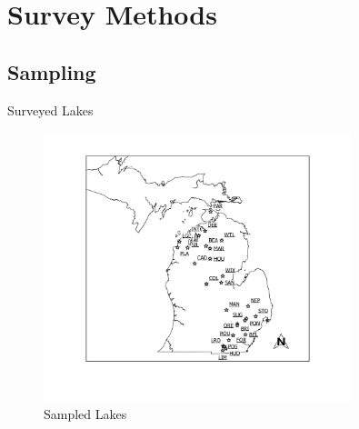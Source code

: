\section{Survey Methods}
\subsection{Sampling}
\begin{frame}{Surveyed Lakes}

\begin{figure}
	\centering
	\includegraphics[width=0.8\textwidth,height=\textheight]{../figures/Overview.png}
	\caption{Sampled Lakes}
\end{figure}

\end{frame}

